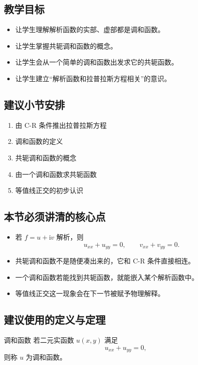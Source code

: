 \subsection*{教学目标}
\begin{itemize}
    \item 让学生理解解析函数的实部、虚部都是调和函数。
    \item 让学生掌握共轭调和函数的概念。
    \item 让学生会从一个简单的调和函数出发求它的共轭函数。
    \item 让学生建立``解析函数和拉普拉斯方程相关''的意识。
\end{itemize}

\subsection*{建议小节安排}
\begin{enumerate}
    \item 由 C-R 条件推出拉普拉斯方程
    \item 调和函数的定义
    \item 共轭调和函数的概念
    \item 由一个调和函数求共轭函数
    \item 等值线正交的初步认识
\end{enumerate}

\subsection*{本节必须讲清的核心点}
\begin{itemize}
    \item 若 $f=u+\mathrm{i}v$ 解析，则
    \[
        u_{xx}+u_{yy}=0,\qquad v_{xx}+v_{yy}=0.
    \]
    \item 共轭调和函数不是随便凑出来的，它和 C-R 条件直接相连。
    \item 一个调和函数若能找到共轭函数，就能嵌入某个解析函数中。
    \item 等值线正交这一现象会在下一节被赋予物理解释。
\end{itemize}

\subsection*{建议使用的定义与定理}
\begin{dingliyi}{调和函数}{}
若二元实函数 $u(x,y)$ 满足
\[
    u_{xx}+u_{yy}=0,
\]
则称 $u$ 为调和函数。
\end{dingliyi}

